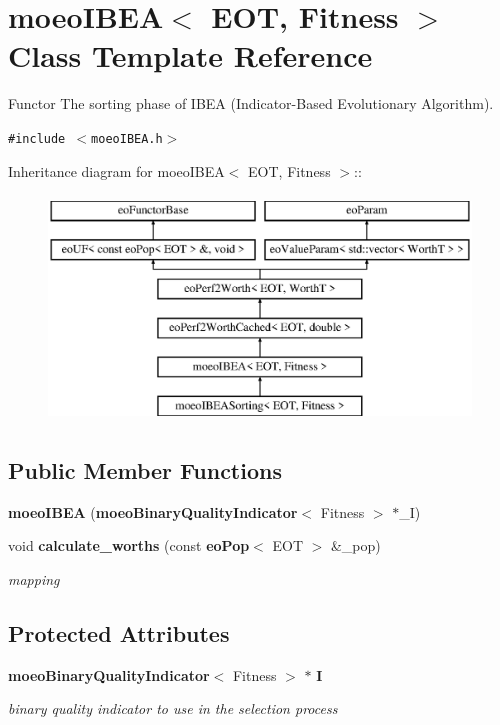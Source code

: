 \section{moeo\-IBEA$<$ EOT, Fitness $>$ Class Template Reference}
\label{classmoeoIBEA}
Functor The sorting phase of IBEA (Indicator-Based Evolutionary Algorithm).  


{\tt \#include $<$moeo\-IBEA.h$>$}

Inheritance diagram for moeo\-IBEA$<$ EOT, Fitness $>$::\begin{figure}[H]
\begin{center}
\leavevmode
\includegraphics[height=6cm]{classmoeoIBEA}
\end{center}
\end{figure}
\subsection*{Public Member Functions}
\begin{CompactItemize}
\item 
{\bf moeo\-IBEA} ({\bf moeo\-Binary\-Quality\-Indicator}$<$ Fitness $>$ $\ast$\_\-I)\label{classmoeoIBEA_3de9693e4e8a723b2e40864ac1f4ac65}

\item 
void {\bf calculate\_\-worths} (const {\bf eo\-Pop}$<$ EOT $>$ \&\_\-pop)
\begin{CompactList}\small\item\em mapping \item\end{CompactList}\end{CompactItemize}
\subsection*{Protected Attributes}
\begin{CompactItemize}
\item 
{\bf moeo\-Binary\-Quality\-Indicator}$<$ Fitness $>$ $\ast$ {\bf I}\label{classmoeoIBEA_15ef4c06c2bf6101e5c3d36e162a3965}

\begin{CompactList}\small\item\em binary quality indicator to use in the selection process \item\end{CompactList}\end{CompactItemize}


